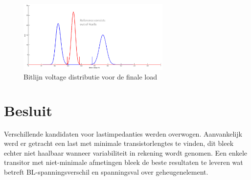 \begin{figure}[!ht]
  \centering
  \includegraphics[width=0.67\textwidth]{../fig/hfdst-last-var2.png}
  \caption{Bitlijn voltage distributie voor de finale load}
  \label{fig:distswitch}
\end{figure}

\section{Besluit}
Verschillende kandidaten voor lastimpedanties werden overwogen. Aanvankelijk werd er getracht een last met minimale transistorlengtes te vinden, dit bleek echter niet haalbaar wanneer variabiliteit in rekening wordt genomen. Een enkele transitor met niet-minimale afmetingen bleek de beste resultaten te leveren wat betreft BL-spanningsverschil en spanningsval over geheugenelement.